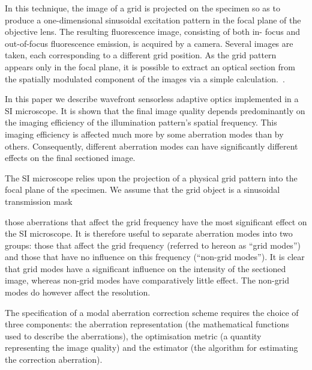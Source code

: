 In this technique, the image of a grid is projected on the specimen so as to 
produce a one-dimensional sinusoidal excitation pattern in the focal plane of 
the objective lens. The resulting fluorescence image, consisting of both in-
focus and out-of-focus fluorescence emission, is acquired by a camera. 
Several images are taken, each corresponding to a different grid position. As 
the grid pattern appears only in the focal plane, it is possible to extract 
an optical section from the spatially modulated component of the images via a 
simple calculation.~\cite{wide_structured_illu_principle}.

In this paper we describe wavefront sensorless adaptive optics implemented in 
a SI microscope. It is shown that the final image quality depends 
predominantly on the imaging efficiency of the illumination pattern’s spatial 
frequency. This imaging efficiency is affected much more by some aberration 
modes than by others. Consequently, different aberration modes can have 
significantly different effects on the final sectioned image.

The SI microscope relies upon the projection of a physical grid pattern into the focal plane of the specimen. We assume that the grid object is a sinusoidal transmission mask

those aberrations that affect the grid frequency have the most significant effect on the SI microscope. It is therefore useful to separate aberration modes into two groups: those that affect the grid frequency (referred to hereon as “grid modes”) and those that have no influence on this frequency (“non-grid modes”). It is clear that grid modes have a significant influence on the intensity of the sectioned image, whereas non-grid modes have comparatively little effect. The non-grid modes do however affect the resolution.

The specification of a modal aberration correction scheme requires the choice of three components: the aberration representation (the mathematical functions used to describe the aberrations), the optimisation metric (a quantity representing the image quality) and the estimator (the algorithm for estimating the correction aberration).

